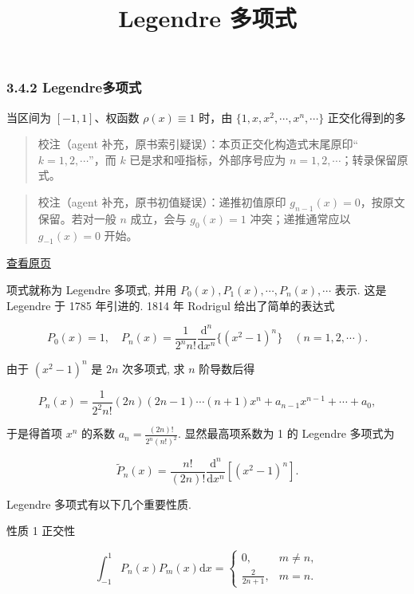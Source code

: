 \documentclass[
  10pt,
  fontset=fandol]{ctexart}
\title{Legendre 多项式}
\author{}
\date{}
\begin{document}
\maketitle

\subsubsection{3.4.2 Legendre多项式}\label{legendreux591aux9879ux5f0f}

当区间为 \([-1, 1]\)、权函数 \(\rho(x) \equiv 1\) 时，由 \(\{1,\allowbreak  x,\allowbreak  x^2,\allowbreak  \cdots,\allowbreak  x^n,\allowbreak  \cdots\}\) 正交化得到的多

\begin{quote}
校注（agent 补充，原书索引疑误）：本页正交化构造式末尾原印``\(k=1,2,\cdots\)''，而 \(k\) 已是求和哑指标，外部序号应为 \(n=1,2,\cdots\)；转录保留原式。
\end{quote}

\begin{quote}
校注（agent 补充，原书初值疑误）：递推初值原印 \(g_{n-1}(x)=0\)，按原文保留。若对一般 \(n\) 成立，会与 \(g_0(x)=1\) 冲突；递推通常应以 \(g_{-1}(x)=0\) 开始。
\end{quote}

\href{../../source-images/pdf-071.jpeg}{查看原页}

项式就称为 Legendre 多项式, 并用 \(P_0(x), P_1(x), \cdots, P_n(x), \cdots\) 表示. 这是 Legendre 于 1785 年引进的. 1814 年 Rodrigul 给出了简单的表达式

\[
P_0(x) = 1, \quad P_n(x) = \frac{1}{2^n n!} \frac{\mathrm{d}^n}{\mathrm{d}x^n} \{(x^2 - 1)^n\} \quad (n = 1, 2, \cdots). \tag{3.4.1}
\]

由于 \((x^2 - 1)^n\) 是 \(2n\) 次多项式, 求 \(n\) 阶导数后得

\[
P_n(x) = \frac{1}{2^2 n!} (2n)(2n - 1) \cdots (n + 1)x^n + a_{n-1}x^{n-1} + \cdots + a_0,
\]

于是得首项 \(x^n\) 的系数 \(a_n = \frac{(2n)!}{2^n (n!)^2}\). 显然最高项系数为 1 的 Legendre 多项式为

\[
\tilde{P}_n(x) = \frac{n!}{(2n)!} \frac{\mathrm{d}^n}{\mathrm{d}x^n} [(x^2 - 1)^n]. \tag{3.4.2}
\]

Legendre 多项式有以下几个重要性质.

性质 1 正交性

\[
\int_{-1}^{1} P_n(x) P_m(x) \mathrm{d}x = \begin{cases} 0, & m \neq n, \\ \frac{2}{2n + 1}, & m = n. \end{cases} \tag{3.4.3}
\]
\end{document}
